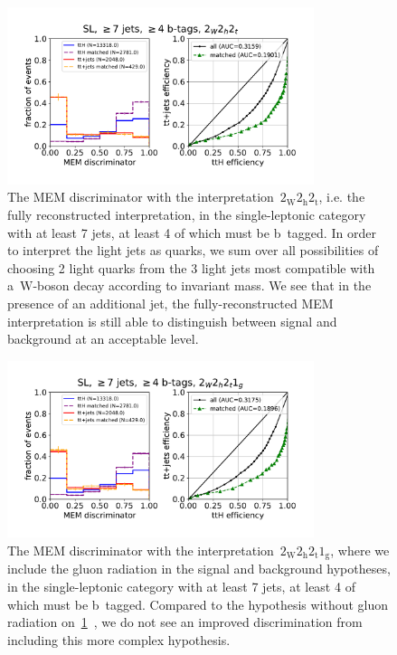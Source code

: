 \begin{figure}[ht]
\begin{centering}
\includegraphics[width = 0.8\textwidth]{figures/mem/mem_sl_jge7_tge4.pdf}
\caption[MEM with the~$2_{\mathrm{W}} 2_{\mathrm{h}} 2_{\mathrm{t}}$ interpretation in the $\ge7$-jet, $\ge4$ b~tag category]{The MEM discriminator with the interpretation~$2_{\mathrm{W}} 2_{\mathrm{h}} 2_{\mathrm{t}}$, i.e. the fully reconstructed interpretation, in the single-leptonic category with at least 7 jets, at least 4 of which must be b~tagged. In order to interpret the light jets as quarks, we sum over all possibilities of choosing 2 light quarks from the 3 light jets most compatible with a~$\mathrm{W}$-boson decay according to invariant mass. We see that in the presence of an additional jet, the fully-reconstructed MEM interpretation is still able to distinguish between signal and background at an acceptable level.}
\label{fig:mem_sl_jge7_tge4}
\end{centering}
\end{figure}

\begin{figure}[ht]
\begin{centering}
\includegraphics[width = 0.8\textwidth]{figures/mem/mem_sl_jge7_tge4_1g.pdf}
\caption[MEM with the~$2_{\mathrm{W}} 2_{\mathrm{h}} 2_{\mathrm{t}} 1_{\mathrm{g}}$ interpretation in the $\ge7$ jet, $\ge4$ b~tag category]{The MEM discriminator with the interpretation~$2_{\mathrm{W}} 2_{\mathrm{h}} 2_{\mathrm{t}} 1_{\mathrm{g}}$, where we include the gluon radiation in the signal and background hypotheses, in the single-leptonic category with at least 7 jets, at least 4 of which must be b~tagged. Compared to the hypothesis without gluon radiation on~\cref{fig:mem_sl_jge7_tge4}~, we do not see an improved discrimination from including this more complex hypothesis.}
\label{fig:mem_sl_jge7_tge4_7jet}
\end{centering}
\end{figure}

